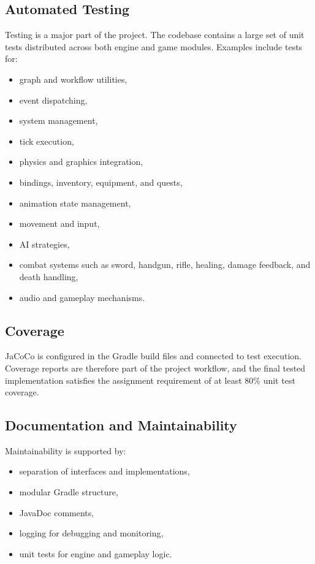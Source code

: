 \documentclass[12pt]{extarticle}
\begin{document}
\subsection{Automated Testing}
Testing is a major part of the project. The codebase contains a large set of unit tests distributed across both engine and game modules. Examples include tests for:
\begin{itemize}[leftmargin=1.5em]
    \item graph and workflow utilities,
    \item event dispatching,
    \item system management,
    \item tick execution,
    \item physics and graphics integration,
    \item bindings, inventory, equipment, and quests,
    \item animation state management,
    \item movement and input,
    \item AI strategies,
    \item combat systems such as sword, handgun, rifle, healing, damage feedback, and death handling,
    \item audio and gameplay mechanisms.
\end{itemize}

\subsection{Coverage}
JaCoCo is configured in the Gradle build files and connected to test execution. Coverage reports are therefore part of the project workflow, and the final tested implementation satisfies the assignment requirement of at least 80\% unit test coverage.

\subsection{Documentation and Maintainability}
Maintainability is supported by:
\begin{itemize}[leftmargin=1.5em]
    \item separation of interfaces and implementations,
    \item modular Gradle structure,
    \item JavaDoc comments,
    \item logging for debugging and monitoring,
    \item unit tests for engine and gameplay logic.
\end{itemize}
\end{document}
